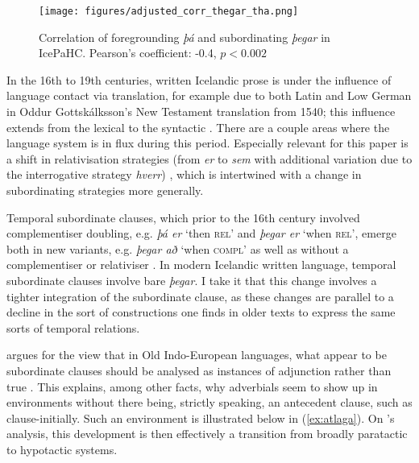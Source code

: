 \documentclass[output=paper,colorlinks,citecolor=brown]{langscibook}
\begin{document}
 \begin{figure}
    \centering
    \texttt{[image: figures/adjusted\_corr\_thegar\_tha.png]}
    \caption{Correlation of foregrounding \textit{þá} and subordinating \textit{þegar} in IcePaHC. Pearson's coefficient: -0.4, $p < 0.002$
}\label{ex:thaandthegar}
\end{figure}

In the 16th to 19th centuries, written Icelandic prose  is under the influence of language contact via translation, for example due to both Latin and Low German in Oddur Gottskálksson's New Testament translation from 1540; this influence extends from the lexical to the syntactic \citep{helgason1929malid}. There are a couple areas where the language system is in flux during this period. Especially relevant for this paper is a shift in relativisation strategies (from \textit{er} to \textit{sem} with additional variation due to the interrogative strategy \textit{hverr}) \citep{brendel2023translation, sapp2019arrested}, which is intertwined with a change in subordinating strategies more generally. 

Temporal subordinate clauses, which prior to the 16th century involved complementiser doubling, e.g. \textit{þá er} `then \textsc{rel}' and \textit{þegar er} `when \textsc{rel}', emerge both in new variants, e.g. \textit{þegar að} `when \textsc{compl}' as well as without a complementiser or relativiser \citep{helgason1929malid}. In modern Icelandic written language, temporal subordinate clauses involve bare \textit{þegar}. I take it that this change involves a tighter integration of the subordinate clause, as these changes are parallel to a decline in the sort of  constructions one finds in older texts to express the same sorts of temporal relations.

\citet{kiparsky1995indo} argues for the view that in Old Indo-European languages, what appear to be subordinate clauses should be analysed as instances of adjunction rather than true . This explains, among other facts, why  adverbials seem to show up in environments without there being, strictly speaking, an antecedent clause, such as clause-initially. Such an environment is illustrated below in (\ref{ex:atlaga}). On \citeauthor{kiparsky1995indo}'s analysis, this development is then effectively a transition from broadly paratactic to hypotactic systems.
\end{document}
